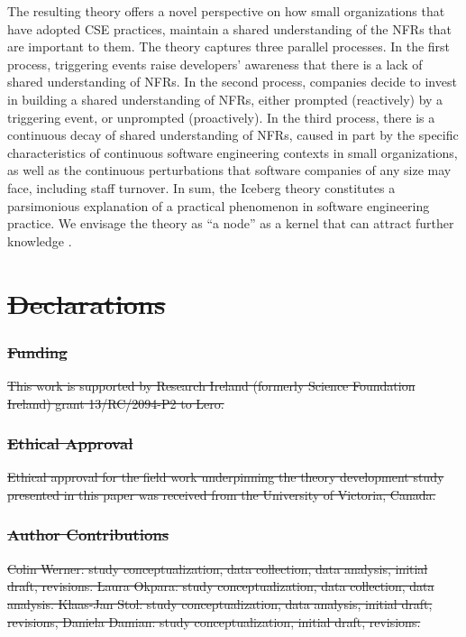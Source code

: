 \documentclass[smallextended]{svjour3}        %
\providecommand{\DIFdeltex}[1]{{\protect\color{red}\sout{#1}}} %
\providecommand{\DIFaddbegin}{} %
\providecommand{\DIFaddend}{} %
\providecommand{\DIFdelbegin}{} %
\providecommand{\DIFdel}[1]{\texorpdfstring{\DIFdeltex{#1}}{}} %
\newcommand{\DIFscaledelfig}{0.5}
\newlength{\DIFdelgraphicswidth} %
\newlength{\DIFdelgraphicsheight} %
\newcommand{\DIFaddincludegraphics}[2][]{{\color{blue}\fbox{\DIFOincludegraphics[#1]{#2}}}} %
\newcommand{\DIFdelincludegraphics}[2][]{%
\sbox{\DIFdelgraphicsbox}{\DIFOincludegraphics[#1]{#2}}%
\settoboxwidth{\DIFdelgraphicswidth}{\DIFdelgraphicsbox} %
\settoboxtotalheight{\DIFdelgraphicsheight}{\DIFdelgraphicsbox} %
\scalebox{\DIFscaledelfig}{%
\parbox[b]{\DIFdelgraphicswidth}{\usebox{\DIFdelgraphicsbox}\\[-\baselineskip] \rule{\DIFdelgraphicswidth}{0em}}\llap{\resizebox{\DIFdelgraphicswidth}{\DIFdelgraphicsheight}{%
\setlength{\unitlength}{\DIFdelgraphicswidth}%
\begin{picture}(1,1)%
\thicklines\linethickness{2pt} %
{\color[rgb]{1,0,0}\put(0,0){\framebox(1,1){}}}%
{\color[rgb]{1,0,0}\put(0,0){\line( 1,1){1}}}%
{\color[rgb]{1,0,0}\put(0,1){\line(1,-1){1}}}%
\end{picture}%
}\hspace*{3pt}}} %
} %
\DeclareRobustCommand{\DIFaddbegin}{\DIFOaddbegin \let\includegraphics\DIFaddincludegraphics} %
\DeclareRobustCommand{\DIFaddend}{\DIFOaddend \let\includegraphics\DIFOincludegraphics} %
\DeclareRobustCommand{\DIFdelbegin}{\DIFOdelbegin \let\includegraphics\DIFdelincludegraphics} %
\begin{document}
The resulting theory offers a novel perspective on how small organizations that have adopted CSE practices, maintain a shared understanding of the NFRs that are important to them. The theory captures three parallel processes.
In the first process, triggering events raise developers' awareness that there is a lack of shared understanding of NFRs. In the second process, companies decide to invest in building a shared understanding of NFRs, either prompted (reactively) by a triggering event, or unprompted (proactively). In the third process, there is a continuous decay of shared understanding of NFRs, caused in part by the specific characteristics of continuous software engineering contexts in small organizations, as well as the continuous perturbations that software companies of any size may face, including staff turnover. 
In sum, the Iceberg theory constitutes a parsimonious explanation of a practical phenomenon in software engineering practice. We envisage the theory as ``a node'' as a kernel that can attract further knowledge \cite[p. xi]{miner2015organizational}.\DIFaddbegin \\
\DIFaddend 




\DIFdelbegin %

\section*{\DIFdel{Declarations}}

\subsubsection*{\DIFdel{Funding}}
\DIFdel{This work is supported by Research Ireland (formerly Science Foundation Ireland) grant 13/RC/2094-P2 to Lero.
}%

\subsubsection*{\DIFdel{Ethical Approval}}
\DIFdel{Ethical approval for the field work underpinning the theory development study presented in this paper was received from the University of Victoria, Canada.
}%

\subsubsection*{\DIFdel{Author Contributions}}
\DIFdel{Colin Werner: study conceptualization, data collection, data analysis, initial draft, revisions. Laura Okpara: study conceptualization, data collection, data analysis. Klaas-Jan Stol: study conceptualization, data analysis, initial draft, revisions, Daniela Damian: study conceptualization, initial draft, revisions. 
}%
\end{document}
